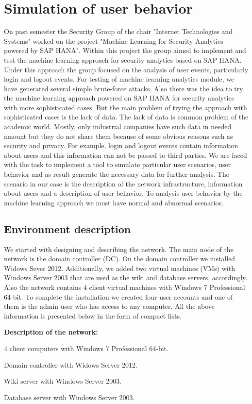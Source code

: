 \section{Simulation of user behavior}
On past semester the Security Group of the chair "Internet Technologies and Systems" worked on the project "Machine Learning for Security Analytics powered by SAP HANA". Within this project the group aimed to implement and test the machine learning approach for security analytics based on SAP HANA. Under this approach the group focused on the analysis of user events, particularly login and logout events. For testing of machine learning analytics module, we have generated several simple brute-force attacks. Also there was the idea to try the machine learning approach powered on SAP HANA for security analytics with more sophisticated cases. But the main problem of trying the approach with sophisticated cases is the lack of data. The lack of data is common problem of the academic world. Mostly, only industrial companies have such data in needed amount but they do not share them because of some obvious reasons such as security and privacy. For example, login and logout events contain information about users and this information can not be passed to third parties. We are faced with the task to implement a tool to simulate particular user scenarios, user behavior and as result generate the necessary data for further analysis.
The scenario in our case is the description of the network infrastructure, information about users and a description of user behavior. To analysis user behavior by the machine learning approach we must have normal and abnormal scenarios.  
  
\subsection{Environment description}
We started with designing and describing the network. The main node of the network is the domain controller (DC). On the domain controller we installed Widows Sever 2012. Additionally, we added two virtual machines (VMs) with Windows Server 2003 that are used as the wiki and database servers, accordingly. Also the network contains 4 client virtual machines with Windows 7 Professional 64-bit. To complete the installation we created four user accounts and one of them is the admin user who has access to any computer. All the above information is presented below in the form of compact lists.

\begin{compactitem}
\item [\textbf{Description of the network:}]
\item 4 client computers with Windows 7 Professional 64-bit.
\item Domain controller with Widows Server 2012.
\item Wiki server with Windows Server 2003.
\item Database server with Windows Server 2003.
\end{compactitem}

